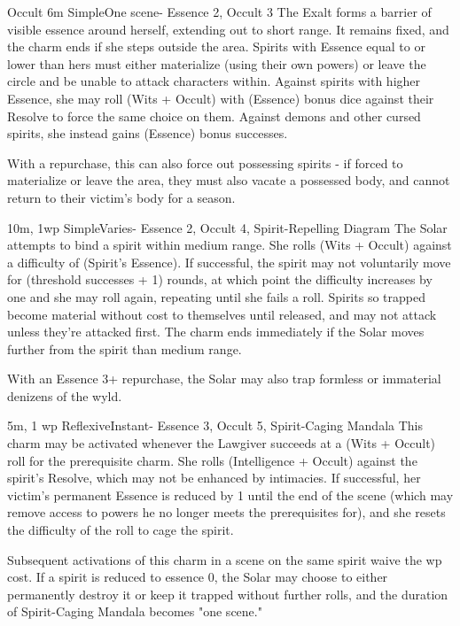 \begin{Ability}{Occult}
  {6m}
  {Simple}{One scene}{-}
  {Essence 2, Occult 3}
  The Exalt forms a barrier of visible essence around herself, extending out to short range. It remains fixed, and the charm ends if she steps outside the area. Spirits with Essence equal to or lower than hers must either materialize (using their own powers) or leave the circle and be unable to attack characters within. Against spirits with higher Essence, she may roll (Wits + Occult) with (Essence) bonus dice against their Resolve to force the same choice on them. Against demons and other cursed spirits, she instead gains (Essence) bonus successes.

  With a repurchase, this can also force out possessing spirits - if forced to materialize or leave the area, they must also vacate a possessed body, and cannot return to their victim's body for a season.

  {10m, 1wp}
  {Simple}{Varies}{-}
  {Essence 2, Occult 4, Spirit-Repelling Diagram}
  The Solar attempts to bind a spirit within medium range. She rolls (Wits + Occult) against a difficulty of (Spirit's Essence). If successful, the spirit may not voluntarily move for (threshold successes + 1) rounds, at which point the difficulty increases by one and she may roll again, repeating until she fails a roll. Spirits so trapped become material without cost to themselves until released, and may not attack unless they're attacked first. The charm ends immediately if the Solar moves further from the spirit than medium range.

  With an Essence 3+ repurchase, the Solar may also trap formless or immaterial denizens of the wyld.

  {5m, 1 wp}
  {Reflexive}{Instant}{-}
  {Essence 3, Occult 5, Spirit-Caging Mandala}
  This charm may be activated whenever the Lawgiver succeeds at a (Wits + Occult) roll for the prerequisite charm. She rolls (Intelligence + Occult) against the spirit's Resolve, which may not be enhanced by intimacies. If successful, her victim's permanent Essence is reduced by 1 until the end of the scene (which may remove access to powers he no longer meets the prerequisites for), and she resets the difficulty of the roll to cage the spirit.

  Subsequent activations of this charm in a scene on the same spirit waive the wp cost. If a spirit is reduced to essence 0, the Solar may choose to either permanently destroy it or keep it trapped without further rolls, and the duration of Spirit-Caging Mandala becomes "one scene."


\end{Ability}
